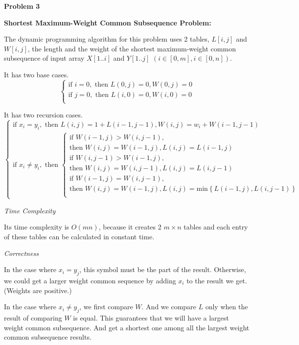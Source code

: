 \documentclass[12pt,letterpaper]{article}
\def\pp{\par\noindent}
\newcommand{\problem}[1]{ \bigskip \pp \textbf{Problem #1}\par}
\begin{document}
\problem{3}
\noindent\textbf{Shortest Maximum-Weight Common Subsequence Problem:}\par
The dynamic programming algorithm for this problem uses 2 tables, $L[i, j]$ and $W[i, j]$, the length and the weight of the shortest maximum-weight common subsequence of input array $X[1..i]$ and $Y[1..j]$ $(i\in[0,m], i\in[0,n])$.\par
It has two base cases.
\[
	\begin{cases}
		\text{if } i=0, \text{ then } L(0,j)=0, W(0,j)=0\\
		\text{if } j=0, \text{ then } L(i,0)=0, W(i,0)=0\\
	\end{cases}
\]\par
It has two recursion cases.
\[
	\begin{cases}
		\text{if } x_i=y_i, \text{ then } L(i,j)=1+L(i-1, j-1), W(i,j)=w_i+W(i-1, j-1)\\
		\text{if } x_i\neq y_i, \text{ then } 
		\begin{cases}
			\text{if } W(i-1,j) > W(i,j-1),\\
			\text{then } W(i,j)=W(i-1,j), L(i,j)=L(i-1,j)\\
			\text{if } W(i,j-1) > W(i-1,j),\\
			\text{then } W(i,j)=W(i,j-1), L(i,j)=L(i,j-1)\\
			\text{if } W(i-1,j) = W(i,j-1),\\
			\text{then } W(i,j)=W(i-1,j), L(i,j)=\text{min}\left\{L(i-1,j), L(i,j-1)\right\}\\
		\end{cases}
	\end{cases}
\]\par
\medskip\noindent\textit{Time Complexity}\par
Its time complexity is $O(mn)$, because it creates 2 $m\times n$ tables and each entry of these tables can be calculated in constant time.\par
\medskip\noindent\textit{Correctness}\par
In the case where $x_i=y_j$, this symbol must be the part of the result. Otherwise, we could get a larger weight common sequence by adding $x_i$ to the result we get.(Weights are positive.)\par
In the case where $x_i\neq y_j$, we first compare $W$. And we compare $L$ only when the result of comparing $W$ is equal. This guarantees that we will have a largest weight common subsequence. And get a shortest one among all the largest weight common subsequence results.\par
\end{document}
